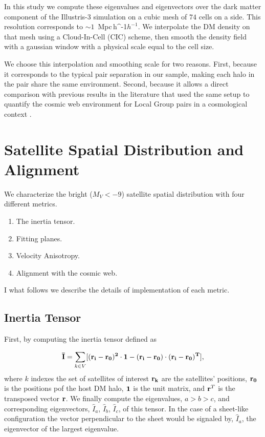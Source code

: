 \documentclass[a4paper,fleqn,usenatbib]{mnras}
\newcommand{\Mpch}{\,{\rm Mpc}\,\ifmmode h^{-1}\else $h^{-1}$\fi}
\begin{document}
In this study we compute these eigenvalues and eigenvectors over the
dark matter component of the Illustris-3 simulation on a cubic mesh of
$74$ cells on a side. 
This resolution corresponds to $\sim 1$ \Mpch.
We interpolate the DM density on that mesh using a Cloud-In-Cell (CIC)
scheme, then smooth the density field with a gaussian window with a
physical scale equal to the cell size. 

We choose this interpolation and smoothing scale for two reasons.
First, because it corresponds to the typical pair separation in our
sample, making each halo in the pair share the same environment.
Second, because it allows a direct comparison with previous results in
the literature that used the same setup to quantify the cosmic
web environment for Local Group pairs in a cosmological context
\citep{ForeroRomero2013,2015ApJ...799...45F}.  

\section{Satellite Spatial Distribution and Alignment}
\label{sec:SpatialMeasurements}

We characterize the bright ($M_V<-9$) satellite spatial distribution
with four different metrics. 

\begin{enumerate}
\item{The inertia tensor}.
\item{Fitting planes}.
\item{Velocity Anisotropy}.
\item{Alignment with the cosmic web}. 
\end{enumerate}

I what follows we describe the details of implementation of each
metric.


\subsection{Inertia Tensor}
\label{sub:inertia}
First, by computing the inertia tensor defined as 

\begin{equation}
{\bf{\bar{I}}} = \sum_{k \in V}[(\bf{r}_i - \bf{r}_0)^2\cdot \bf{1} -
  (\bf{r}_i-\bf{r}_0)\cdot (\bf{r}_i - \bf{r}_0)^{T}],
\end{equation}
%
where $k$ indexes the set of satellites of interest
$\bf{r}_k$ are the satellites' positions, $\bf{r}_{0}$ is the
positions pof the host DM halo, $\bf{1}$ is the unit matrix,  and
${\bf r}^T$ is the transposed vector $\bf{r}$. 
We finally compute the eigenvalues, $a>b>c$, and corresponding
eigenvectors, $\hat{I}_a$, $\hat{I}_b$, $\hat{I}_c$, of this tensor.
In the case of a sheet-like configuration the vector perpendicular to
the sheet would be signaled by, $\hat{I}_a$, the eigenvector of the
largest eigenvalue. 
\end{document}
